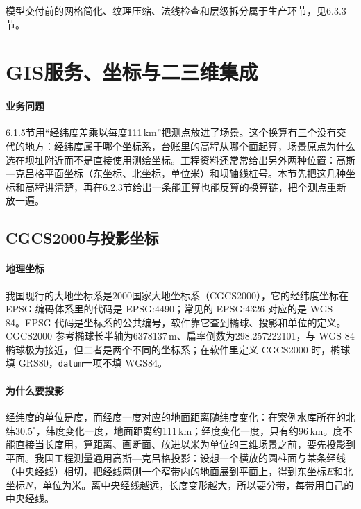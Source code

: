 模型交付前的网格简化、纹理压缩、法线检查和层级拆分属于生产环节，见6.3.3节。

\section{GIS服务、坐标与二三维集成}


\paragraph{业务问题}6.1.5节用“经纬度差乘以每度111\,km”把测点放进了场景。这个换算有三个没有交代的地方：经纬度属于哪个坐标系，台账里的高程从哪个面起算，场景原点为什么选在坝址附近而不是直接使用测绘坐标。工程资料还常常给出另外两种位置：高斯—克吕格平面坐标（东坐标、北坐标，单位米）和坝轴线桩号。本节先把这几种坐标和高程讲清楚，再在6.2.3节给出一条能正算也能反算的换算链，把\cpStationCount 个测点重新放一遍。

\subsection{CGCS2000与投影坐标}

\paragraph{地理坐标}我国现行的大地坐标系是2000国家大地坐标系（CGCS2000），它的经纬度坐标在 EPSG 编码体系里的代码是 EPSG:4490\cite{epsg4490}；常见的 EPSG:4326 对应的是 WGS 84。EPSG 代码是坐标系的公共编号，软件靠它查到椭球、投影和单位的定义。CGCS2000 参考椭球长半轴为6378137\,m、扁率倒数为298.257222101，与 WGS 84 椭球极为接近，但二者是两个不同的坐标系；在软件里定义 CGCS2000 时，椭球填 GRS80，\texttt{datum}一项不填 WGS84。

\paragraph{为什么要投影}经纬度的单位是度，而经度一度对应的地面距离随纬度变化：在案例水库所在的北纬$30.5^\circ$，纬度变化一度，地面距离约111\,km；经度变化一度，只有约96\,km。度不能直接当长度用，算距离、画断面、放进以米为单位的三维场景之前，要先投影到平面。我国工程测量通用高斯—克吕格投影：设想一个横放的圆柱面与某条经线（中央经线）相切，把经线两侧一个窄带内的地面展到平面上，得到东坐标$E$和北坐标$N$，单位为米。离中央经线越远，长度变形越大，所以要分带，每带用自己的中央经线。

